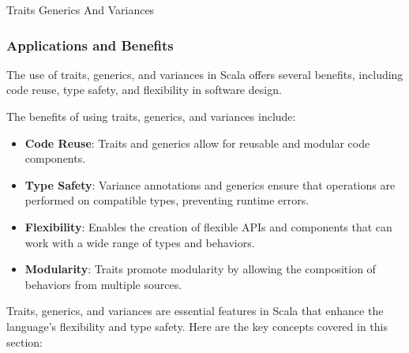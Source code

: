 \begin{notes}{Traits Generics And Variances}
\begin{highlight}
    \end{highlight}
    
    \subsubsection*{Applications and Benefits}
    
    The use of traits, generics, and variances in Scala offers several benefits, including code reuse, type safety, and flexibility in software design.
    
    \begin{highlight}
    
        The benefits of using traits, generics, and variances include:
    
        \begin{itemize}
            \item \textbf{Code Reuse}: Traits and generics allow for reusable and modular code components.
            \item \textbf{Type Safety}: Variance annotations and generics ensure that operations are performed on compatible types, preventing runtime errors.
            \item \textbf{Flexibility}: Enables the creation of flexible APIs and components that can work with a wide range of types and behaviors.
            \item \textbf{Modularity}: Traits promote modularity by allowing the composition of behaviors from multiple sources.
        \end{itemize}
    
    \end{highlight}
    
    \begin{highlight}
    
        Traits, generics, and variances are essential features in Scala that enhance the language's flexibility and type safety. Here are the key concepts covered in this section:
    

\end{highlight}
\end{notes}
